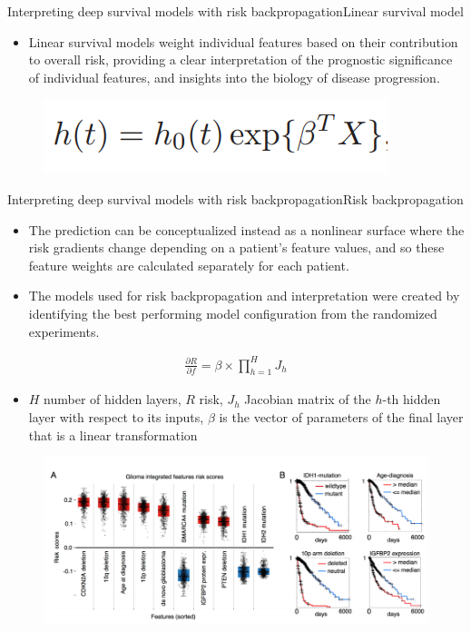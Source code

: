 \documentclass[
]{beamer}
\begin{document}
	\begin{frame}{Interpreting deep survival models with risk backpropagation}{Linear survival model}
		\begin{itemize}
			\item Linear survival models weight individual
			features based on their contribution to overall risk, providing a clear interpretation of the prognostic significance
			of individual features, and insights into the biology of disease progression.
		\end{itemize}
		\begin{figure}
			\includegraphics[scale=0.5]{cox1}
		\end{figure}
	\end{frame}
	
	\begin{frame}{Interpreting deep survival models with risk backpropagation}{Risk backpropagation}
		\begin{itemize}
			\item  The prediction can be conceptualized instead as a nonlinear surface where the risk gradients change
			depending on a patient's feature values, and so these feature weights are calculated separately for each patient.
			\item The models used for risk backpropagation and
			interpretation were created by identifying the best performing model configuration from the randomized
			experiments.
		\end{itemize}
		\begin{align*}
		\frac{\partial R}{\partial f}=\beta\times\prod_{h=1}^{H} J_h
		\end{align*}
		\begin{itemize}
			\item $H$ number of hidden layers, $R$ risk, $J_h$ Jacobian matrix of the $h$-th hidden layer with respect to its inputs, $\beta$ is the vector of parameters
			of the final layer that is a linear transformation
		\end{itemize}
	\end{frame}
	
	
	\begin{frame}
		\begin{figure}
			\includegraphics[scale=0.4]{fea1}
		\end{figure}
	\end{frame}
	
\end{document}
